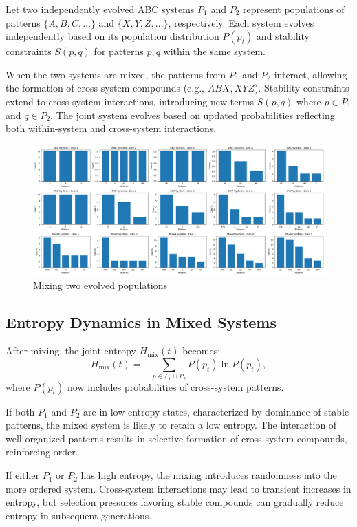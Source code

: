 \documentclass[entropy,article,submit,pdftex,moreauthors]{Definitions/mdpi}
\begin{document}
Let two independently evolved ABC systems \( P_1 \) and \( P_2 \) represent populations of patterns \( \{A, B, C, \dots\} \) and \( \{X, Y, Z, \dots\} \), respectively. Each system evolves independently based on its population distribution \( P(p_t) \) and stability constraints \( S(p, q) \) for patterns \( p, q \) within the same system.

When the two systems are mixed, the patterns from \( P_1 \) and \( P_2 \) interact, allowing the formation of cross-system compounds (e.g., \( ABX, XYZ \)). Stability constraints extend to cross-system interactions, introducing new terms \( S(p, q) \) where \( p \in P_1 \) and \( q \in P_2 \). The joint system evolves based on updated probabilities reflecting both within-system and cross-system interactions.

\begin{figure}[htp]
    \centering
    \includegraphics[width=13cm]{mixed_1}
    \caption{Mixing two evolved populations}
    \label{fig:mixed_1}
\end{figure}

\subsection{Entropy Dynamics in Mixed Systems}

After mixing, the joint entropy \( H_{\text{mix}}(t) \) becomes:
\[
H_{\text{mix}}(t) = -\sum_{p \in P_1 \cup P_2} P(p_t) \ln P(p_t),
\]
where \( P(p_t) \) now includes probabilities of cross-system patterns.

If both \( P_1 \) and \( P_2 \) are in low-entropy states, characterized by dominance of stable patterns, the mixed system is likely to retain a low entropy. The interaction of well-organized patterns results in selective formation of cross-system compounds, reinforcing order.

If either \( P_1 \) or \( P_2 \) has high entropy, the mixing introduces randomness into the more ordered system. Cross-system interactions may lead to transient increases in entropy, but selection pressures favoring stable compounds can gradually reduce entropy in subsequent generations.
\end{document}
